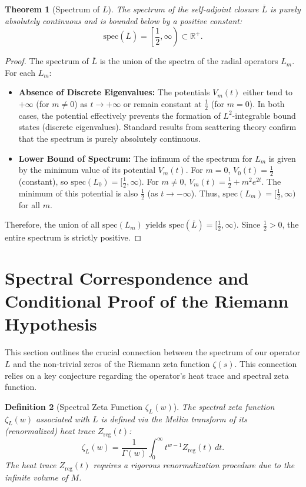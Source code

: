 \documentclass[12pt]{article}
\newtheorem{theorem}{Theorem}[section]
\newtheorem{definition}[theorem]{Definition}
\begin{document}
\begin{theorem}[Spectrum of $L$]
The spectrum of the self-adjoint closure $\overline{L}$ is purely absolutely continuous and is bounded below by a positive constant:
\begin{equation}
\text{spec}(\overline{L}) = \left[\frac{1}{2}, \infty\right) \subset \mathbb{R}^+.
\end{equation}
\end{theorem}
\begin{proof}
The spectrum of $\overline{L}$ is the union of the spectra of the radial operators $L_m$. For each $L_m$:
\begin{itemize}
    \item \textbf{Absence of Discrete Eigenvalues:} The potentials $V_m(t)$ either tend to $+\infty$ (for $m \neq 0$) as $t \to +\infty$ or remain constant at $\frac{1}{2}$ (for $m = 0$). In both cases, the potential effectively prevents the formation of $L^2$-integrable bound states (discrete eigenvalues). Standard results from scattering theory confirm that the spectrum is purely absolutely continuous.
    \item \textbf{Lower Bound of Spectrum:} The infimum of the spectrum for $L_m$ is given by the minimum value of its potential $V_m(t)$. For $m = 0$, $V_0(t) = \frac{1}{2}$ (constant), so $\text{spec}(L_0) = [\frac{1}{2}, \infty)$. For $m \neq 0$, $V_m(t) = \frac{1}{2} + m^2 e^{2t}$. The minimum of this potential is also $\frac{1}{2}$ (as $t \to -\infty$). Thus, $\text{spec}(L_m) = [\frac{1}{2}, \infty)$ for all $m$.
\end{itemize}
Therefore, the union of all $\text{spec}(L_m)$ yields $\text{spec}(\overline{L}) = [\frac{1}{2}, \infty)$. Since $\frac{1}{2} > 0$, the entire spectrum is strictly positive.
\end{proof}

\section{Spectral Correspondence and Conditional Proof of the Riemann Hypothesis}

This section outlines the crucial connection between the spectrum of our operator $L$ and the non-trivial zeros of the Riemann zeta function $\zeta(s)$. This connection relies on a key conjecture regarding the operator's heat trace and spectral zeta function.

\begin{definition}[Spectral Zeta Function $\zeta_L(w)$]
The spectral zeta function $\zeta_L(w)$ associated with $L$ is defined via the Mellin transform of its (renormalized) heat trace $Z_{\text{reg}}(t)$:
\begin{equation}
\zeta_L(w) = \frac{1}{\Gamma(w)} \int_0^\infty t^{w-1} Z_{\text{reg}}(t) \, dt.
\end{equation}
The heat trace $Z_{\text{reg}}(t)$ requires a rigorous renormalization procedure due to the infinite volume of $M$.
\end{definition}
\end{document}
